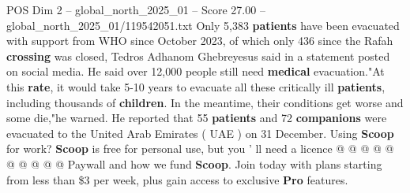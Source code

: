\begin{textsample}{POS Dim 2 – global\_north\_2025\_01 – Score 27.00 – global\_north\_2025\_01/119542051.txt}
Only 5,383 \textbf{patients} have been evacuated with support from WHO since October 2023, of which only 436 since the Rafah \textbf{crossing} was closed, Tedros Adhanom Ghebreyesus said in a statement posted on social media.
He said over 12,000 people still need \textbf{medical} evacuation."At this \textbf{rate}, it would take 5-10 years to evacuate all these critically ill \textbf{patients}, including thousands of \textbf{children}.
In the meantime, their conditions get worse and some die,"he warned.
He reported that 55 \textbf{patients} and 72 \textbf{companions} were evacuated to the United Arab Emirates ( UAE ) on 31 December.
Using \textbf{Scoop} for work? \textbf{Scoop} is free for personal use, but you ' ll need a licence @ @ @ @ @ @ @ @ @ @ Paywall and how we fund \textbf{Scoop}.
Join today with plans starting from less than \$3 per week, plus gain access to exclusive \textbf{Pro} features.

\end{textsample}

